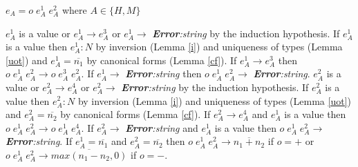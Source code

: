 \begin{case}
$e_{A}=o\;e_{A}^{1}\;e_{A}^{2}$ where $A\in\lbrace H,M\rbrace$

$e_{A}^{1}$ is a value or $e_{A}^{1}\rightarrow e_{A}^{3}$ or $e_{A}^{1}\rightarrow$ \emph{\textbf{Error}:\;string} by the induction hypothesis.  If $e_{A}^{1}$ is a value then $e_{A}^{1}:N$ by inversion (Lemma \ref{i}) and uniqueness of types (Lemma \ref{uot}) and $e_{A}^{1}=\overline{n_{1}}$ by canonical forms (Lemma \ref{cf}).  If $e_{A}^{1}\rightarrow e_{A}^{3}$ then $o\;e_{A}^{1}\;e_{A}^{2}\rightarrow o\;e_{A}^{3}\;e_{A}^{2}$.  If $e_{A}^{1}\rightarrow$ \emph{\textbf{Error}:\;string} then $o\;e_{A}^{1}\;e_{A}^{2}\rightarrow$ \emph{\textbf{Error}:\;string}.  $e_{A}^{2}$ is a value or $e_{A}^{2}\rightarrow e_{A}^{4}$ or $e_{A}^{2}\rightarrow$ \emph{\textbf{Error}:\;string} by the induction hypothesis.  If $e_{A}^{2}$ is a value then $e_{A}^{2}:N$ by inversion (Lemma \ref{i}) and uniqueness of types (Lemma \ref{uot}) and $e_{A}^{2}=\overline{n_{2}}$ by canonical forms (Lemma \ref{cf}).  If $e_{A}^{2}\rightarrow e_{A}^{4}$ and $e_{A}^{1}$ is a value then $o\;e_{A}^{1}\;e_{A}^{2}\rightarrow o\;e_{A}^{1}\;e_{A}^{4}$.  If $e_{A}^{2}\rightarrow$ \emph{\textbf{Error}:\;string} and $e_{A}^{1}$ is a value then $o\;e_{A}^{1}\;e_{A}^{2}\rightarrow$ \emph{\textbf{Error}:\;string}.  If $e_{A}^{1}=\overline{n_{1}}$ and $e_{A}^{2}=\overline{n_{2}}$ then $o\;e_{A}^{1}\;e_{A}^{2}\rightarrow\overline{n_{1}+n_{2}}$ if $o=+$ or $o\;e_{A}^{1}\;e_{A}^{2}\rightarrow\overline{max(n_{1}-n_{2},0)}$ if $o=-$.
\end{case}